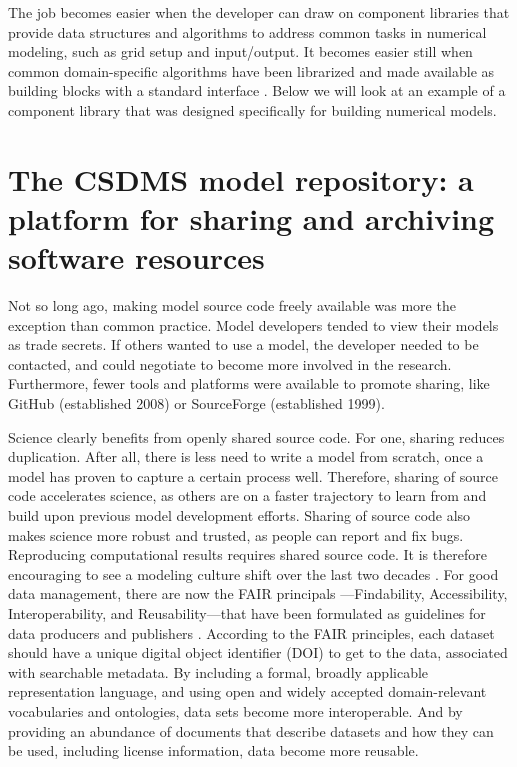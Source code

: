 \documentclass[journal abbreviation, manuscript]{copernicus}
\begin{document}
The job becomes easier when the developer can draw on component libraries that provide data structures and algorithms to address common tasks in numerical modeling, such as grid setup and input/output. It becomes easier still when common domain-specific algorithms have been librarized and made available as building blocks with a standard interface \citep[e.g.,][]{brown2014run}. Below we will look at an example of a component library that was designed specifically for building numerical models.



\section{The CSDMS model repository: a platform for sharing and archiving software resources}
\label{sec:repo}

Not so long ago, making model source code freely available was more the exception than common practice. Model developers tended to view their models as trade secrets. If others wanted to use a model, the developer needed to be contacted, and could negotiate to become more involved in the research. Furthermore, fewer tools and platforms were available to promote sharing, like GitHub (established 2008) or SourceForge (established 1999).

Science clearly benefits from openly shared source code. For one, sharing reduces duplication. After all, there is less need to write a model from scratch, once a model has proven to capture a certain process well. Therefore, sharing of source code accelerates science, as others are on a faster trajectory to learn from and build upon previous model development efforts. Sharing of source code also makes science more robust and trusted, as people can report and fix bugs. Reproducing computational results requires shared source code. It is therefore encouraging to see a modeling culture shift over the last two decades \citep[e.g.,][]{hsu2015data}. For good data management, there are now the FAIR principals ---Findability, Accessibility, Interoperability, and Reusability---that have been formulated as guidelines for data producers and publishers \citep{wilkinson2016fair}. According to the FAIR principles, each dataset should have a unique digital object identifier (DOI) to get to the data, associated with searchable metadata. By including a formal, broadly applicable representation language, and using open and widely accepted domain-relevant vocabularies and ontologies, data sets become more interoperable. And by providing an abundance of documents that describe datasets and how they can be used, including license information, data become more reusable.
\end{document}
